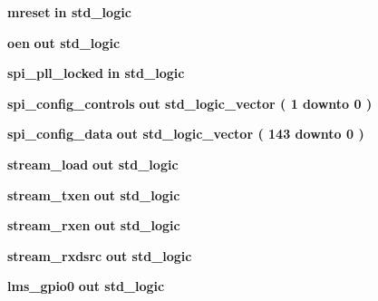 \begin{DoxyCompactItemize}
{\bf mreset}  {\bfseries {\bfseries \textcolor{keywordflow}{in}\textcolor{vhdlchar}{ }}} {\bfseries \textcolor{comment}{std\+\_\+logic}\textcolor{vhdlchar}{ }} 
\item 
{\bf oen}  {\bfseries {\bfseries \textcolor{keywordflow}{out}\textcolor{vhdlchar}{ }}} {\bfseries \textcolor{comment}{std\+\_\+logic}\textcolor{vhdlchar}{ }} 
\item 
{\bf spi\+\_\+pll\+\_\+locked}  {\bfseries {\bfseries \textcolor{keywordflow}{in}\textcolor{vhdlchar}{ }}} {\bfseries \textcolor{comment}{std\+\_\+logic}\textcolor{vhdlchar}{ }} 
\item 
{\bf spi\+\_\+config\+\_\+controls}  {\bfseries {\bfseries \textcolor{keywordflow}{out}\textcolor{vhdlchar}{ }}} {\bfseries \textcolor{comment}{std\+\_\+logic\+\_\+vector}\textcolor{vhdlchar}{ }\textcolor{vhdlchar}{(}\textcolor{vhdlchar}{ }\textcolor{vhdlchar}{ } \textcolor{vhdldigit}{1} \textcolor{vhdlchar}{ }\textcolor{keywordflow}{downto}\textcolor{vhdlchar}{ }\textcolor{vhdlchar}{ } \textcolor{vhdldigit}{0} \textcolor{vhdlchar}{ }\textcolor{vhdlchar}{)}\textcolor{vhdlchar}{ }} 
\item 
{\bf spi\+\_\+config\+\_\+data}  {\bfseries {\bfseries \textcolor{keywordflow}{out}\textcolor{vhdlchar}{ }}} {\bfseries \textcolor{comment}{std\+\_\+logic\+\_\+vector}\textcolor{vhdlchar}{ }\textcolor{vhdlchar}{(}\textcolor{vhdlchar}{ }\textcolor{vhdlchar}{ } \textcolor{vhdldigit}{143} \textcolor{vhdlchar}{ }\textcolor{keywordflow}{downto}\textcolor{vhdlchar}{ }\textcolor{vhdlchar}{ } \textcolor{vhdldigit}{0} \textcolor{vhdlchar}{ }\textcolor{vhdlchar}{)}\textcolor{vhdlchar}{ }} 
\item 
{\bf stream\+\_\+load}  {\bfseries {\bfseries \textcolor{keywordflow}{out}\textcolor{vhdlchar}{ }}} {\bfseries \textcolor{comment}{std\+\_\+logic}\textcolor{vhdlchar}{ }} 
\item 
{\bf stream\+\_\+txen}  {\bfseries {\bfseries \textcolor{keywordflow}{out}\textcolor{vhdlchar}{ }}} {\bfseries \textcolor{comment}{std\+\_\+logic}\textcolor{vhdlchar}{ }} 
\item 
{\bf stream\+\_\+rxen}  {\bfseries {\bfseries \textcolor{keywordflow}{out}\textcolor{vhdlchar}{ }}} {\bfseries \textcolor{comment}{std\+\_\+logic}\textcolor{vhdlchar}{ }} 
\item 
{\bf stream\+\_\+rxdsrc}  {\bfseries {\bfseries \textcolor{keywordflow}{out}\textcolor{vhdlchar}{ }}} {\bfseries \textcolor{comment}{std\+\_\+logic}\textcolor{vhdlchar}{ }} 
\item 
{\bf lms\+\_\+gpio0}  {\bfseries {\bfseries \textcolor{keywordflow}{out}\textcolor{vhdlchar}{ }}} {\bfseries \textcolor{comment}{std\+\_\+logic}\textcolor{vhdlchar}{ }} 

\end{DoxyCompactItemize}
